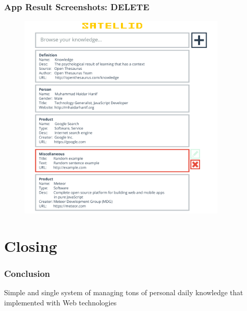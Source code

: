 \documentclass[10pt, compress]{beamer}
\begin{document}

\begin{frame}[fragile]
  \frametitle{App Result Screenshots: DELETE}

  \begin{figure}[ht]
    \centering
    \vspace{-1cm}
    \includegraphics[height=10cm]{include/satellid-app-results_delete.png}
    \vspace{-10pt}
    \label{fig:satellid-app-results_delete}
  \end{figure}

\end{frame}


\section{Closing}


\begin{frame}[fragile]
  \frametitle{Conclusion}

  Simple and \alert{single system} of managing tons of \alert{personal daily knowledge}
  that implemented with \alert{Web technologies}

\end{frame}

\end{document}
